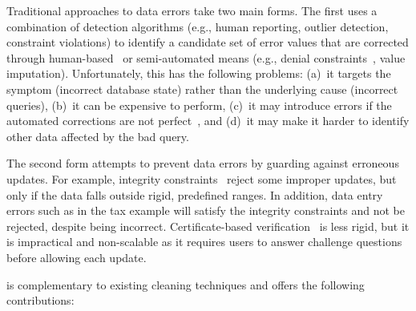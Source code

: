 Traditional approaches to data errors take two main forms. The first
uses a combination of detection algorithms (e.g., human reporting,
outlier detection, constraint violations) to identify a candidate set
of error values that are corrected through
human-based~\cite{haasclamshell,Gokhale:2014wv,Kandel:2011vj} or
semi-automated means (e.g., denial constraints~\cite{ChuIP13}, value
imputation). Unfortunately, this has the following problems: (a)~it targets the symptom (incorrect
database state) rather than the underlying cause (incorrect queries),
(b)~it can be expensive to perform, (c)~it may introduce errors if
the automated corrections are not perfect~\cite{paolo study}, and (d)~it may make it harder to identify other data affected by the bad query.

The second form attempts to prevent data errors by guarding against erroneous updates.  For example, integrity constraints~\cite{Khoussainova2006} reject some improper updates, but only if the data falls outside rigid, predefined ranges.  In addition, data entry errors such as in the tax example will satisfy the integrity constraints and not be rejected, despite being incorrect.  Certificate-based verification~\cite{Chen2011} is less rigid, but it is impractical and non-scalable as it requires users to answer challenge questions before allowing each update.


\sys is complementary to existing cleaning techniques and offers the following contributions:

